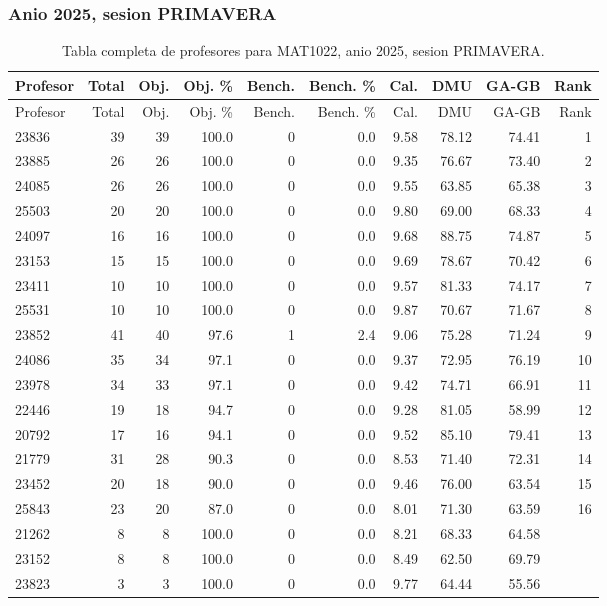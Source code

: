 \subsubsection{Anio 2025, sesion PRIMAVERA}

\begingroup
\scriptsize
\setlength{\tabcolsep}{3pt}
\begin{longtable}{lrrrrrrrrr}
\caption{Tabla completa de profesores para MAT1022, anio 2025, sesion PRIMAVERA.}\label{tab:prof-period-mat1022-2025-primavera-especializado}\\
\toprule
Profesor & Total & Obj. & Obj. \% & Bench. & Bench. \% & Cal. & DMU & GA-GB & Rank \\
\midrule
\endfirsthead
\toprule
Profesor & Total & Obj. & Obj. \% & Bench. & Bench. \% & Cal. & DMU & GA-GB & Rank \\
\midrule
\endhead
23836 & 39 & 39 & 100.0 & 0 & 0.0 & 9.58 & 78.12 & 74.41 & 1 \\
23885 & 26 & 26 & 100.0 & 0 & 0.0 & 9.35 & 76.67 & 73.40 & 2 \\
24085 & 26 & 26 & 100.0 & 0 & 0.0 & 9.55 & 63.85 & 65.38 & 3 \\
25503 & 20 & 20 & 100.0 & 0 & 0.0 & 9.80 & 69.00 & 68.33 & 4 \\
24097 & 16 & 16 & 100.0 & 0 & 0.0 & 9.68 & 88.75 & 74.87 & 5 \\
23153 & 15 & 15 & 100.0 & 0 & 0.0 & 9.69 & 78.67 & 70.42 & 6 \\
23411 & 10 & 10 & 100.0 & 0 & 0.0 & 9.57 & 81.33 & 74.17 & 7 \\
25531 & 10 & 10 & 100.0 & 0 & 0.0 & 9.87 & 70.67 & 71.67 & 8 \\
23852 & 41 & 40 & 97.6 & 1 & 2.4 & 9.06 & 75.28 & 71.24 & 9 \\
24086 & 35 & 34 & 97.1 & 0 & 0.0 & 9.37 & 72.95 & 76.19 & 10 \\
23978 & 34 & 33 & 97.1 & 0 & 0.0 & 9.42 & 74.71 & 66.91 & 11 \\
22446 & 19 & 18 & 94.7 & 0 & 0.0 & 9.28 & 81.05 & 58.99 & 12 \\
20792 & 17 & 16 & 94.1 & 0 & 0.0 & 9.52 & 85.10 & 79.41 & 13 \\
21779 & 31 & 28 & 90.3 & 0 & 0.0 & 8.53 & 71.40 & 72.31 & 14 \\
23452 & 20 & 18 & 90.0 & 0 & 0.0 & 9.46 & 76.00 & 63.54 & 15 \\
25843 & 23 & 20 & 87.0 & 0 & 0.0 & 8.01 & 71.30 & 63.59 & 16 \\
21262 & 8 & 8 & 100.0 & 0 & 0.0 & 8.21 & 68.33 & 64.58 &  \\
23152 & 8 & 8 & 100.0 & 0 & 0.0 & 8.49 & 62.50 & 69.79 &  \\
23823 & 3 & 3 & 100.0 & 0 & 0.0 & 9.77 & 64.44 & 55.56 &  \\
\bottomrule
\end{longtable}
\endgroup